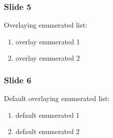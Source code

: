 \documentclass[t]{beamer}
\begin{document}
\begin{frame}[fragile]
\frametitle{Slide 5}


Overlaying enumerated list:
\begin{enumerate}[<+-| alert@+>]

\item overlay enumerated 1

\item overlay enumerated 2
\end{enumerate}

\end{frame}

\begin{frame}[fragile]
\frametitle{Slide 6}


Default overlaying enumerated list:
\begin{enumerate}[<+-| alert@+>]

\item default enumerated 1

\item default enumerated 2
\end{enumerate}

\end{frame}
\end{document}

